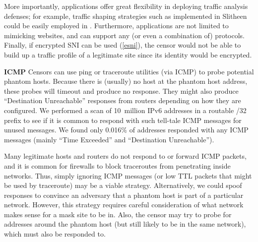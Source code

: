 \documentclass[sigconf]{acmart}
\renewcommand{\paragraph}[1]{\smallskip\noindent\textbf{#1\quad}}
\begin{document}
More importantly, \scheme applications offer great flexibility in deploying traffic analysis defenses; for example, traffic shaping strategies such as implemented in Slitheen~\cite{slitheen16} could be easily employed in \scheme. Furthermore,
\scheme applications are not limited to mimicking websites, and can support
any (or even a combination of) protocols. Finally, if encrypted SNI can be used (\cref{esni}), the censor would not be able to build up a traffic profile of a legitimate site since its identity would be encrypted.

\paragraph{ICMP}
Censors can use ping or traceroute utilities (via ICMP) to probe potential phantom
hosts. Because there is (usually) no host at the phantom host address, these
probes will timeout and produce no response. They might also produce
``Destination Unreachable'' responses from routers depending on how they are
configured. We performed a scan of 10~million IPv6 addresses in a routable /32
prefix to see if it is common to respond with such tell-tale ICMP messages for
unused messages. We found only 0.016\% of addresses responded with any ICMP
messages (mainly ``Time Exceeded'' and ``Destination Unreachable'').

Many legitimate hosts and routers do not respond to or forward ICMP packets, and
it is common for firewalls to block traceroutes from penetrating inside
networks. Thus, simply ignoring ICMP messages (or low TTL packets that might be
used by traceroute) may be a viable strategy. %
Alternatively, we could spoof responses to convince an adversary that a 
phantom host is part of a particular network. However, this strategy requires careful
consideration of what network makes sense for a mask site to be in. Also, the
censor may try to probe for addresses around the phantom host (but still likely to
be in the same network), which must also be responded to.




\FigIpBits
\end{document}
